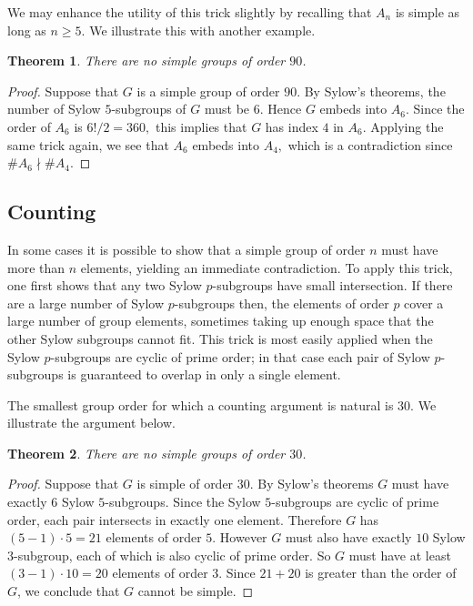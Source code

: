 \documentclass[11pt, oneside]{article}   	%
\newtheorem{theorem}{Theorem}
\begin{document}
We may enhance the utility of this trick slightly by recalling that $A_n$ is simple as long as $n\geq 5.$  We illustrate this with another example.

\begin{theorem}
There are no simple groups of order $90$.
\end{theorem}

\begin{proof}
Suppose that $G$ is a simple group of order $90$.  By Sylow's theorems, the number of Sylow $5$-subgroups of $G$ must be $6$.  Hence $G$ embeds into $A_6$.  Since the order of $A_6$ is $6!/2 = 360,$ this implies that $G$ has index $4$ in $A_6.$  Applying the same trick again, we see that $A_6$ embeds into $A_4,$ which is a contradiction since $\# A_6 \nmid \# A_4.$
\end{proof}

\subsection{Counting}

In some cases it is possible to show that a simple group of order $n$ must have more than $n$ elements, yielding an immediate contradiction.  To apply this trick, one first shows that any two Sylow $p$-subgroups have small intersection.  If there are a large number of Sylow $p$-subgroups then, the elements of order $p$ cover a large number of group elements, sometimes taking up enough space that the other Sylow subgroups cannot fit.  This trick is most easily applied when the Sylow $p$-subgroups are cyclic of prime order; in that case each pair of Sylow $p$-subgroups is guaranteed to overlap in only a single element.

The smallest group order for which a counting argument is natural is $30.$  We illustrate the argument below.
\begin{theorem}
There are no simple groups of order $30$.
\end{theorem}

\begin{proof}
Suppose that $G$ is simple of order $30$.  By Sylow's theorems $G$ must have exactly $6$ Sylow $5$-subgroups.  Since the Sylow $5$-subgroups are cyclic of prime order, each pair intersects in exactly one element.  Therefore $G$ has $(5-1) \cdot 5 = 21$ elements of order $5$.  However $G$ must also have exactly $10$ Sylow $3$-subgroup, each of which is also cyclic of prime order.  So $G$ must have at least $(3-1)\cdot 10 = 20$ elements of order $3$.  Since $21 + 20$ is greater than the order of $G$, we conclude that $G$ cannot be simple.  
\end{proof}
\end{document}
